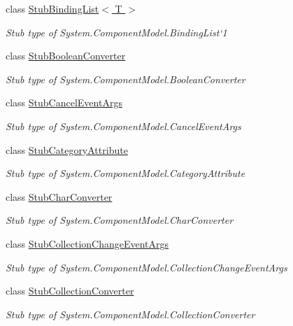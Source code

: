 \begin{DoxyCompactItemize}
class \hyperlink{class_system_1_1_component_model_1_1_fakes_1_1_stub_binding_list_3_01_t_01_4}{Stub\-Binding\-List$<$ T $>$}
\begin{DoxyCompactList}\small\item\em Stub type of System.\-Component\-Model.\-Binding\-List`1\end{DoxyCompactList}\item 
class \hyperlink{class_system_1_1_component_model_1_1_fakes_1_1_stub_boolean_converter}{Stub\-Boolean\-Converter}
\begin{DoxyCompactList}\small\item\em Stub type of System.\-Component\-Model.\-Boolean\-Converter\end{DoxyCompactList}\item 
class \hyperlink{class_system_1_1_component_model_1_1_fakes_1_1_stub_cancel_event_args}{Stub\-Cancel\-Event\-Args}
\begin{DoxyCompactList}\small\item\em Stub type of System.\-Component\-Model.\-Cancel\-Event\-Args\end{DoxyCompactList}\item 
class \hyperlink{class_system_1_1_component_model_1_1_fakes_1_1_stub_category_attribute}{Stub\-Category\-Attribute}
\begin{DoxyCompactList}\small\item\em Stub type of System.\-Component\-Model.\-Category\-Attribute\end{DoxyCompactList}\item 
class \hyperlink{class_system_1_1_component_model_1_1_fakes_1_1_stub_char_converter}{Stub\-Char\-Converter}
\begin{DoxyCompactList}\small\item\em Stub type of System.\-Component\-Model.\-Char\-Converter\end{DoxyCompactList}\item 
class \hyperlink{class_system_1_1_component_model_1_1_fakes_1_1_stub_collection_change_event_args}{Stub\-Collection\-Change\-Event\-Args}
\begin{DoxyCompactList}\small\item\em Stub type of System.\-Component\-Model.\-Collection\-Change\-Event\-Args\end{DoxyCompactList}\item 
class \hyperlink{class_system_1_1_component_model_1_1_fakes_1_1_stub_collection_converter}{Stub\-Collection\-Converter}
\begin{DoxyCompactList}\small\item\em Stub type of System.\-Component\-Model.\-Collection\-Converter\end{DoxyCompactList}\item 

\end{DoxyCompactItemize}
